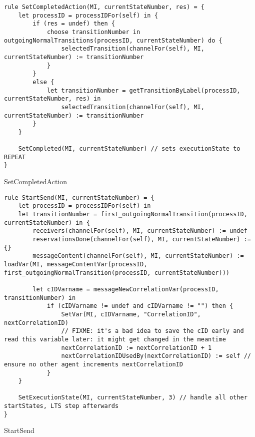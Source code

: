 \begin{listing}[H]
\begin{verbatim}
rule SetCompletedAction(MI, currentStateNumber, res) = {
    let processID = processIDFor(self) in {
        if (res = undef) then {
            choose transitionNumber in outgoingNormalTransitions(processID, currentStateNumber) do {
                selectedTransition(channelFor(self), MI, currentStateNumber) := transitionNumber
            }
        }
        else {
            let transitionNumber = getTransitionByLabel(processID, currentStateNumber, res) in
                selectedTransition(channelFor(self), MI, currentStateNumber) := transitionNumber
        }
    }

    SetCompleted(MI, currentStateNumber) // sets executionState to REPEAT
}
\end{verbatim}
\caption{SetCompletedAction}
\label{lst:asm:SetCompletedAction}
\end{listing}





\begin{listing}[H]
\begin{verbatim}
rule StartSend(MI, currentStateNumber) = {
    let processID = processIDFor(self) in
    let transitionNumber = first_outgoingNormalTransition(processID, currentStateNumber) in {
        receivers(channelFor(self), MI, currentStateNumber) := undef
        reservationsDone(channelFor(self), MI, currentStateNumber) := {}
        messageContent(channelFor(self), MI, currentStateNumber) := loadVar(MI, messageContentVar(processID, first_outgoingNormalTransition(processID, currentStateNumber)))

        let cIDVarname = messageNewCorrelationVar(processID, transitionNumber) in
            if (cIDVarname != undef and cIDVarname != "") then {
                SetVar(MI, cIDVarname, "CorrelationID", nextCorrelationID)
                // FIXME: it's a bad idea to save the cID early and read this variable later: it might get changed in the meantime
                nextCorrelationID := nextCorrelationID + 1
                nextCorrelationIDUsedBy(nextCorrelationID) := self // ensure no other agent increments nextCorrelationID
            }
    }

    SetExecutionState(MI, currentStateNumber, 3) // handle all other startStates, LTS step afterwards
}
\end{verbatim}
\caption{StartSend}
\label{lst:asm:StartSend}
\end{listing}




